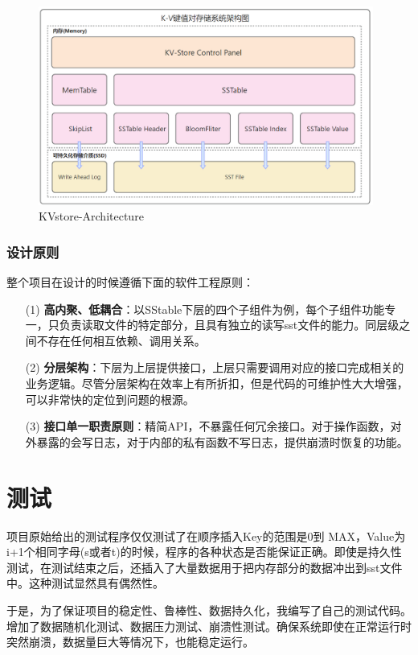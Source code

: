 \documentclass[fontset=windows]{article}
\begin{document}
\begin{figure}[h!]
  \centering
  \includegraphics[width=0.98\textwidth]{Image/LSM-Architecture.png}
  \caption{KVstore-Architecture}
  \label{fig:LSM-Structure}
\end{figure}

\subsubsection{设计原则}
整个项目在设计的时候遵循下面的软件工程原则：

\begin{itemize}
    \item [(1)] \textbf{高内聚、低耦合}：以SStable下层的四个子组件为例，每个子组件功能专一，只负责读取文件的特定部分，且具有独立的读写sst文件的能力。同层级之间不存在任何相互依赖、调用关系。
    \item [(2)] \textbf{分层架构}：下层为上层提供接口，上层只需要调用对应的接口完成相关的业务逻辑。尽管分层架构在效率上有所折扣，但是代码的可维护性大大增强，可以非常快的定位到问题的根源。
    \item [(3)] \textbf{接口单一职责原则}：精简API，不暴露任何冗余接口。对于操作函数，对外暴露的会写日志，对于内部的私有函数不写日志，提供崩溃时恢复的功能。
\end{itemize}


\section{测试}
项目原始给出的测试程序仅仅测试了在顺序插入Key的范围是0到 MAX，Value为i+1个相同字母(s或者t)的时候，程序的各种状态是否能保证正确。即使是持久性测试，在测试结束之后，还插入了大量数据用于把内存部分的数据冲出到sst文件中。这种测试显然具有偶然性。

于是，为了保证项目的稳定性、鲁棒性、数据持久化，我编写了自己的测试代码。增加了数据随机化测试、数据压力测试、崩溃性测试。确保系统即使在正常运行时突然崩溃，数据量巨大等情况下，也能稳定运行。
\end{document}
